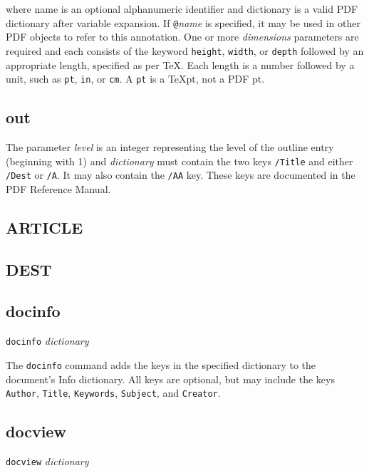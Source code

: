
where name is an optional alphanumeric identifier and dictionary
is a valid PDF dictionary after variable expansion.
If {\tt @}{\it name} is specified, it may be used in
other PDF objects to refer to this annotation.
One or more {\it dimensions} parameters are required
and each consists of the keyword
{\tt height}, {\tt width}, or {\tt depth} followed
by an appropriate length, specified as per \TeX.  Each
length is a number followed by a unit, such as {\tt pt},
{\tt in}, or {\tt cm}.  A {\tt pt} is a \TeX pt, not a PDF pt.

\example
{}%


\subsection{out}

The parameter {\it level} is an integer representing the level of the outline
entry (beginning with 1) and {\it dictionary} must contain
the two keys {\tt /Title} and either {\tt /Dest} or {\tt /A}.
It may also contain the {\tt /AA} key.  These keys are documented
in the PDF Reference Manual.

\subsection{ARTICLE}

\subsection{DEST}

\subsection{docinfo}

{\tt docinfo} {\it dictionary}

The {\tt docinfo} command adds the keys in the specified dictionary to the
document's Info dictionary.  All keys are optional, but may include
the keys {\tt Author}, {\tt Title}, {\tt Keywords}, {\tt Subject},
and {\tt Creator}.

\subsection{docview}
{\tt docview} {\it dictionary}

